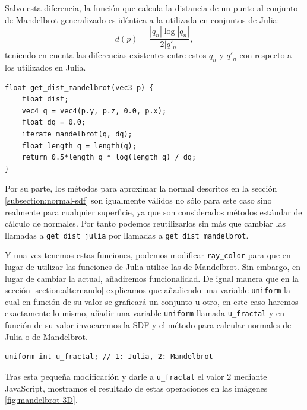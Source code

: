 Salvo esta diferencia, la función que calcula la distancia de un punto al conjunto de Mandelbrot generalizado es idéntica a la utilizada en conjuntos de Julia: 
$$
d(p)=\dfrac{|q_n|\log|q_n|}{2|q'_n|},
$$
teniendo en cuenta las diferencias existentes entre estos $q_n$ y $q'_n$ con respecto a los utilizados en Julia.

\begin{lstlisting}
float get_dist_mandelbrot(vec3 p) {
    float dist;
    vec4 q = vec4(p.y, p.z, 0.0, p.x);
    float dq = 0.0;
    iterate_mandelbrot(q, dq);
    float length_q = length(q);
    return 0.5*length_q * log(length_q) / dq;
}
\end{lstlisting}

Por su parte, los métodos para aproximar la normal descritos en la sección \ref{subsection:normal-sdf} son igualmente válidos no sólo para este caso sino realmente para cualquier superficie, ya que son considerados métodos estándar de cálculo de normales. Por tanto podemos reutilizarlos sin más que cambiar las llamadas a \verb|get_dist_julia| por llamadas a \verb|get_dist_mandelbrot|. 

Y una vez tenemos estas funciones, podemos modificar \verb|ray_color| para que en lugar de utilizar las funciones de Julia utilice las de Mandelbrot. Sin embargo, en lugar de cambiar la actual, añadiremos funcionalidad. De igual manera que en la sección \ref{section:alternando} explicamos que añadiendo una variable \verb|uniform| la cual en función de su valor se graficará un conjunto u otro, en este caso haremos exactamente lo mismo, añadir una variable \verb|uniform| llamada \verb|u_fractal| y en función de su valor invocaremos la SDF y el método para calcular normales de Julia o de Mandelbrot.

\begin{lstlisting}
uniform int u_fractal; // 1: Julia, 2: Mandelbrot 
\end{lstlisting}

Tras esta pequeña modificación y darle a \verb|u_fractal| el valor $2$ mediante JavaScript, mostramos el resultado de estas operaciones en las imágenes \ref{fig:mandelbrot-3D}.

